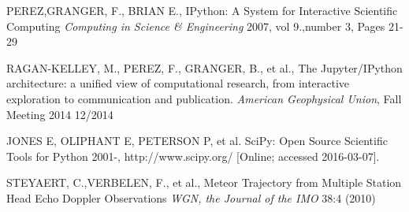 \documentclass[twoside]{ctuthesis}
\theoremstyle{plain}
\theoremstyle{definition}
\theoremstyle{note}
\begin{document}
\begin{thebibliography}{99}
PEREZ,GRANGER, F.,  BRIAN E.,
IPython: A System for Interactive Scientific Computing
\emph{Computing in Science \& Engineering}
2007, vol 9.,number 3,  Pages 21-29

RAGAN-KELLEY, M., PEREZ, F., GRANGER, B., et al.,
The Jupyter/IPython architecture: a unified view of computational research, from interactive exploration to communication and publication.
\emph{American Geophysical Union}, Fall Meeting 2014
12/2014

JONES E, OLIPHANT E, PETERSON P, et al.
SciPy: Open Source Scientific Tools for Python
2001-, http://www.scipy.org/ [Online; accessed 2016-03-07].

STEYAERT, C.,VERBELEN, F., et al.,
Meteor Trajectory from Multiple Station Head Echo Doppler Observations
\emph{WGN, the Journal of the IMO} 38:4 (2010)

\end{thebibliography}
\end{document}
